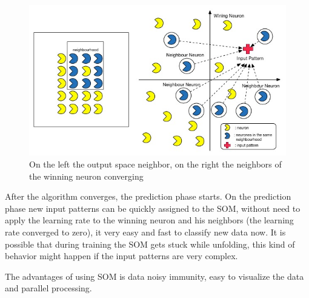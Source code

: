 \begin{figure}
  \begin{center}
    \includegraphics[width=12cm]{images/5_neighbours_converge.jpg}
  \end{center}
  \caption{ On the left the output space neighbor, on the right the neighbors of the winning neuron converging }
  \label{fig:5_neighbours_converge}
\end{figure}

After the algorithm converges, the prediction phase starts. On the prediction phase new input patterns can be quickly assigned to the SOM, without need to apply the learning rate to the winning neuron and his neighbors (the learning rate converged to zero), it very easy and fast to classify new data now. It is possible that during training the SOM gets stuck while unfolding, this kind of behavior might happen if the input patterns are very complex.

The advantages of using SOM is data noisy immunity, easy to visualize the data and parallel processing.


